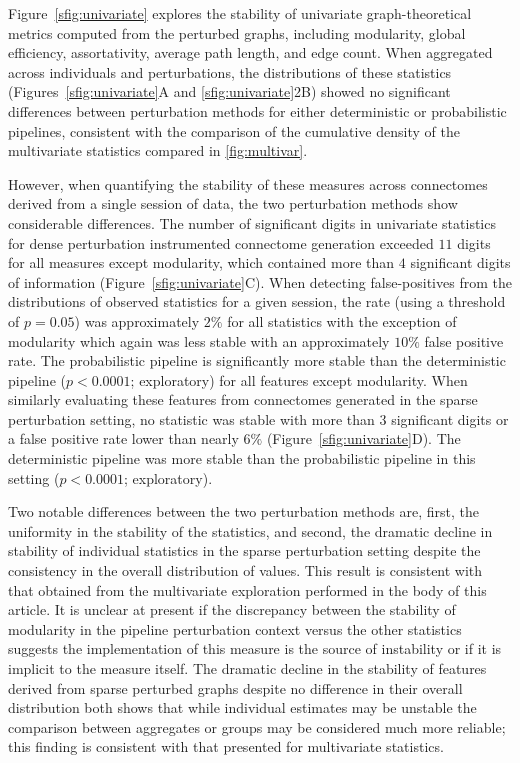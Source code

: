 \documentclass[fleqn,10pt]{SelfArx} %
\newcommand{\new}[1]{{#1}}
\begin{document}
Figure~\ref{sfig:univariate} explores the stability of univariate graph-theoretical metrics computed from the perturbed
graphs, including modularity, global efficiency, assortativity, average path length, and edge count. When aggregated
across individuals and perturbations, the distributions of these statistics (Figures~\ref{sfig:univariate}A and
\ref{sfig:univariate}2B) showed no significant differences between perturbation methods for either deterministic or
probabilistic pipelines\new{, consistent with the comparison of the cumulative density of the multivariate statistics
compared in \ref{fig:multivar}}.

However, when quantifying the stability of these measures across connectomes derived from a single session of data, the
two perturbation methods show considerable differences. The number of significant digits in univariate statistics for
\new{dense} perturbation instrumented connectome generation exceeded $11$ digits for all measures except modularity, which
contained more than $4$ significant digits of information (Figure~\ref{sfig:univariate}C). When detecting \new{false-positives}
from the distributions of observed statistics for a given session, the rate (using a threshold of $p = 0.05$)
was approximately $2\%$ for all statistics with the exception of modularity which again was less stable with an
approximately $10\%$ false positive rate. The probabilistic pipeline is significantly more stable than the
deterministic pipeline ($p < 0.0001$; exploratory) for all features except modularity. When similarly evaluating these
features from connectomes generated in the \new{sparse} perturbation setting, no statistic was stable with more than $3$
significant digits or a false positive rate lower than nearly $6\%$ (Figure~\ref{sfig:univariate}D). The deterministic
pipeline was more stable than the probabilistic pipeline in this setting ($p < 0.0001$; exploratory).

Two notable differences between the two perturbation methods are, first, the uniformity in the stability of the
statistics, and second, the dramatic decline in stability of individual statistics in the \new{sparse} perturbation setting
despite the consistency in the overall distribution of values. \new{This result is consistent with that obtained
from the multivariate exploration performed in the body of this article.} It is unclear at present if the discrepancy
between the stability of modularity in the pipeline perturbation context versus the other statistics suggests the
implementation of this measure is the source of instability or if it is implicit to the measure itself. The dramatic
decline in the stability of features derived from \new{sparse} perturbed graphs despite no difference in their overall
distribution both shows that while individual estimates may be unstable the comparison between aggregates or groups may
be considered much more reliable; this finding is consistent with that presented for multivariate statistics.
\end{document}

